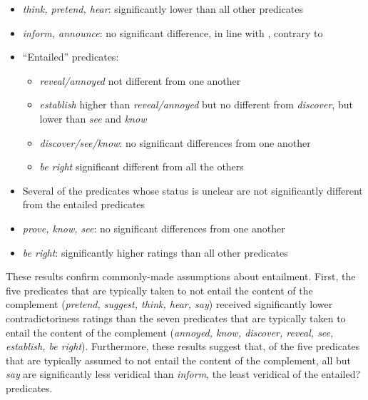 \documentclass[11pt,fleqn]{article}
\newcommand{\6}{\mbox{$[\hspace*{-.6mm}[$}}
\newcommand{\9}{\mbox{$]\hspace*{-.6mm}]$}}
\begin{document}
\begin{itemize}

\item {\em think, pretend, hear}: significantly lower than all other predicates

\item {\em inform, announce}: no significant difference, in line with \citealt{anand-hacquard2014}, contrary to \citealt{schlenker10}

\item ``Entailed'' predicates:   

\begin{itemize}

\item {\em reveal/annoyed} not different from one another 

\item {\em establish} higher than {\em reveal/annoyed} but no different from {\em discover}, but lower than {\em see} and {\em know}

\item {\em discover/see/know}: no significant differences from one another

\item {\em be right} significant different from all the others

\end{itemize}

\item Several of the predicates whose status is unclear are not significantly different from the entailed predicates

\item {\em prove, know, see}: no significant differences from one another

\item {\em be right}: significantly higher ratings than all other predicates 

\end{itemize}

These results confirm commonly-made assumptions about entailment. First, the five predicates that are typically taken to not entail the content of the complement ({\em pretend, suggest, think, hear, say}) received significantly lower contradictoriness ratings than the seven predicates that are typically taken to entail the content of the complement ({\em annoyed, know, discover, reveal, see, establish, be right}). Furthermore, these results suggest that, of the five predicates that are typically assumed to not entail the content of the complement, all but {\em say} are significantly less veridical than {\em inform}, the least veridical of the entailed? predicates.
\end{document}
